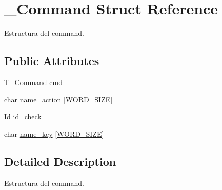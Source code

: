 \hypertarget{struct__Command}{\section{\+\_\+\+Command Struct Reference}
\label{struct__Command}
}


Estructura del command.  


\subsection*{Public Attributes}
\begin{DoxyCompactItemize}
\item 
\hyperlink{command_8h_a0473597db8c45c0289b6b8e2f8abbe32}{T\+\_\+\+Command} \hyperlink{struct__Command_a61f89a0ef775ee09992b647cb25029c4}{cmd}
\item 
char \hyperlink{struct__Command_a150c0602ca49194027822cc452b0bbf9}{name\+\_\+action} \mbox{[}\hyperlink{types_8h_a92ed8507d1cd2331ad09275c5c4c1c89}{W\+O\+R\+D\+\_\+\+S\+I\+Z\+E}\mbox{]}
\item 
\hyperlink{types_8h_a845e604fb28f7e3d97549da3448149d3}{Id} \hyperlink{struct__Command_adc4d5ed3a25bef9cd4a42742aa2ffc10}{id\+\_\+check}
\item 
char \hyperlink{struct__Command_a855e97a299b38e0d729cee1299a44ca9}{name\+\_\+key} \mbox{[}\hyperlink{types_8h_a92ed8507d1cd2331ad09275c5c4c1c89}{W\+O\+R\+D\+\_\+\+S\+I\+Z\+E}\mbox{]}
\end{DoxyCompactItemize}


\subsection{Detailed Description}
Estructura del command. 

